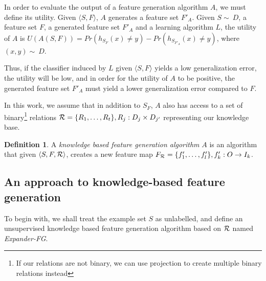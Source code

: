 \documentclass{article}
\theoremstyle{definition}
\newtheorem{defn}{Definition}[section]
\begin{document}
In order to evaluate the output of a feature generation algorithm $A$, we must define its utility. Given $\langle S,F \rangle$, $A$ generates a feature set $F'_A$.
Given $S\sim\ D$, a feature set $F$, a generated feature set $F'_A$ and a learning algorithm $L$, the utility of $A$ is $U(A(S,F))=Pr(h_{S_F}(x)\neq y)-Pr(h_{S_{F'_A}}(x)\neq y)$, where $(x,y)\sim\ D$.

Thus, if the classifier induced by $L$ given  $\langle S,F \rangle$ yields a low generalization error, the utility will be low, and in order for the utility of $A$ to be positive, the generated feature set $F'_A$ must yield a lower generalization error compared to $F$.

In this work, we assume that in addition to $S_F$, $A$ also has access to a set of binary\footnote{If our relations are not binary, we can use projection to create multiple binary relations instead} relations ${\cal R}=\{R_{1},\ldots,R_{t}\}, R_j:D_j\times D_{j'}$ representing our knowledge base. 
\begin{defn}
	A \emph{knowledge based feature generation algorithm} $A$ is an algorithm that given $\langle S,F,{\cal R} \rangle$, creates a new feature map $F_{{\cal R}}=\{f'_{1},\ldots,f'_{l}\}, f'_{k}:O\rightarrow I_k$.
\end{defn}


\subsection{An approach to knowledge-based feature generation} \label{shallow_section}

To begin with, we shall treat the example set $S$ as unlabelled, and define an unsupervised knowledge based feature generation algorithm based on ${\cal R}$ named \emph{Expander-FG}. %
\end{document}
